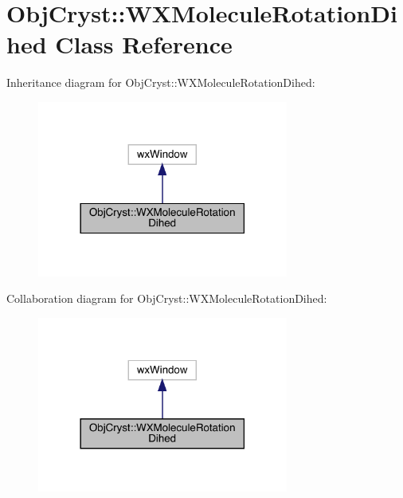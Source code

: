 \hypertarget{class_obj_cryst_1_1_w_x_molecule_rotation_dihed}{}\section{Obj\+Cryst\+::W\+X\+Molecule\+Rotation\+Dihed Class Reference}
\label{class_obj_cryst_1_1_w_x_molecule_rotation_dihed}


Inheritance diagram for Obj\+Cryst\+::W\+X\+Molecule\+Rotation\+Dihed\+:
\nopagebreak
\begin{figure}[H]
\begin{center}
\leavevmode
\includegraphics[width=234pt]{class_obj_cryst_1_1_w_x_molecule_rotation_dihed__inherit__graph}
\end{center}
\end{figure}


Collaboration diagram for Obj\+Cryst\+::W\+X\+Molecule\+Rotation\+Dihed\+:
\nopagebreak
\begin{figure}[H]
\begin{center}
\leavevmode
\includegraphics[width=234pt]{class_obj_cryst_1_1_w_x_molecule_rotation_dihed__coll__graph}
\end{center}
\end{figure}
